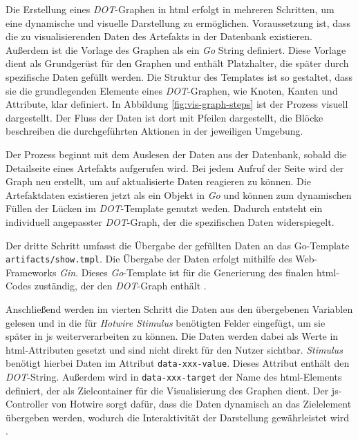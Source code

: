 \par Die Erstellung eines \textit{DOT}-Graphen in \gls{html} erfolgt in mehreren Schritten, um eine dynamische und visuelle Darstellung zu ermöglichen. Voraussetzung ist, dass die zu visualisierenden Daten des Artefakts in der Datenbank existieren. Außerdem ist die Vorlage des Graphen als ein \textit{Go} String definiert. Diese Vorlage dient als Grundgerüst für den Graphen und enthält Platzhalter, die später durch spezifische Daten gefüllt werden. Die Struktur des Templates ist so gestaltet, dass sie die grundlegenden Elemente eines \textit{DOT}-Graphen, wie Knoten, Kanten und Attribute, klar definiert. In Abbildung \ref{fig:vis-graph-steps} ist der Prozess visuell dargestellt. Der Fluss der Daten ist dort mit Pfeilen dargestellt, die Blöcke beschreiben die durchgeführten Aktionen in der jeweiligen Umgebung.
\par Der Prozess beginnt mit dem Auslesen der Daten aus der Datenbank, sobald die Detailseite eines Artefakts aufgerufen wird. Bei jedem Aufruf der Seite wird der Graph neu erstellt, um auf aktualisierte Daten reagieren zu können. Die Artefaktdaten existieren jetzt als ein Objekt in \textit{Go} und können zum dynamischen Füllen der Lücken im \textit{DOT}-Template genutzt weden. Dadurch entsteht ein individuell angepasster \textit{DOT}-Graph, der die spezifischen Daten widerspiegelt.
\par Der dritte Schritt umfasst die Übergabe der gefüllten Daten an das Go-Template \verb|artifacts/show.tmpl|. Die Übergabe der Daten erfolgt mithilfe des Web-Frameworks \textit{Gin}. Dieses \textit{Go}-Template ist für die Generierung des finalen \gls{html}-Codes zuständig, der den \textit{DOT}-Graph enthält \autocite{GingonicGinGin}.
\par Anschließend werden im vierten Schritt die Daten aus den übergebenen Variablen gelesen und in die für \textit{Hotwire Stimulus} benötigten Felder eingefügt, um sie später in \gls{js} weiterverarbeiten zu können. Die Daten werden dabei als Werte in \gls{html}-Attributen gesetzt und sind nicht direkt für den Nutzer sichtbar. \textit{Stimulus} benötigt hierbei Daten im Attribut \verb|data-xxx-value|. Dieses Attribut enthält den \textit{DOT}-String. Außerdem wird in \verb|data-xxx-target| der Name des \gls{html}-Elements definiert, der als Zielcontainer für die Visualisierung des Graphen dient. Der \gls{js}-Controller von Hotwire sorgt dafür, dass die Daten dynamisch an das Zielelement übergeben werden, wodurch die Interaktivität der Darstellung gewährleistet wird \autocite{StimulusReference}.
